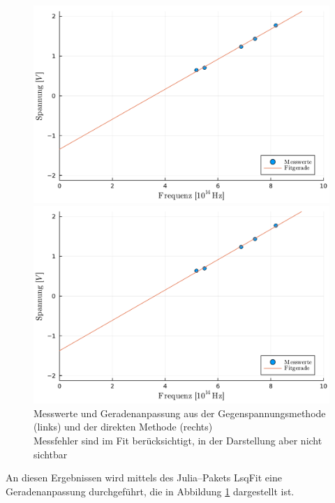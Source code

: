 \documentclass[12pt,a4paper]{scrartcl}
\numberwithin{equation}{section} %
\newcommand{\code}[1]{\textsf{#1}}
\begin{document}
\begin{figure}[h!]
	\begin{minipage}{0.5\textwidth}
		\includegraphics[width=\linewidth]{../media/B1.4/gegenPlot.pdf}
	\end{minipage}
	\begin{minipage}{0.5\textwidth}
		\includegraphics[width=\linewidth]{../media/B1.4/direktPlot.pdf}
	\end{minipage}
	\caption{Messwerte und Geradenanpassung aus der Gegenspannungsmethode (links) und der direkten Methode (rechts) \\
		Messfehler sind im Fit berücksichtigt, in der Darstellung aber nicht sichtbar}
	\label{fig:fitGeraden}
\end{figure}

\noindent
An diesen Ergebnissen wird mittels des \code{Julia}--Pakets \code{LsqFit} \cite{Julia:LsqFit} eine Geradenanpassung durchgeführt, die in Abbildung \ref{fig:fitGeraden} dargestellt ist.
\end{document}
